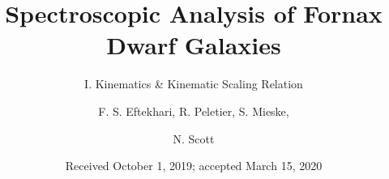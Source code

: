 \documentclass{aa}
\begin{document}
 


   \title{Spectroscopic Analysis of Fornax Dwarf Galaxies}

   \subtitle{I. Kinematics \& Kinematic Scaling Relation}

   \author{F. S. Eftekhari, R. Peletier, S. Mieske, \and N. Scott }


   \date{Received October 1, 2019; accepted March 15, 2020}

 
  \abstract
   {\bigskip}
   {\bigskip}
   {\bigskip}
   {\bigskip}
   {}

   \keywords{\bigskip}

   \maketitle
%
\end{document}
